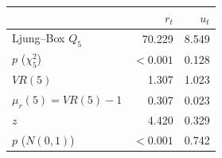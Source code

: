 \begin{tabular}{lrr}
\toprule
 & $r_t$ & $u_t$ \\
\midrule
Ljung--Box $Q_5$ & 70.229 & 8.549 \\
\quad $p$ ($\chi^2_5$) & $<0.001$ & 0.128 \\
$VR(5)$ & 1.307 & 1.023 \\
$\mu_r(5) = VR(5)-1$ & 0.307 & 0.023 \\
\quad $z$ & 4.420 & 0.329 \\
\quad $p$ ($N(0,1)$) & $<0.001$ & 0.742 \\
\bottomrule
\end{tabular}
